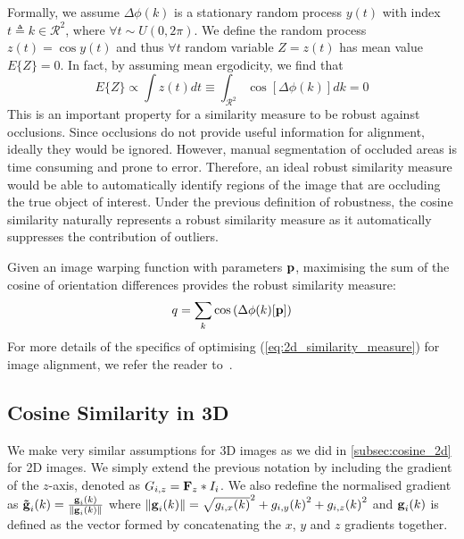 Formally, we assume $\Delta \phi(k)$ is a stationary random process $y(t)$ with
index $t \triangleq k \in \mathcal{R}^2$, where $\forall t \sim U(0, 2\pi)$. We
define the random process $z(t) = \cos{y(t)}$ and thus $\forall t$ random
variable $Z = z(t)$ has mean value $E\{Z\} = 0$. In fact, by assuming mean
ergodicity, we find that
\begin{equation}\label{eq:cosine_integral}
    E\{Z\} \propto \int z(t) dt \equiv \int_{\mathcal{R}^2} \cos[\Delta \phi(k)] dk = 0
\end{equation}
This is an important property for a similarity measure to be robust against
occlusions. Since occlusions do not provide useful information for alignment,
ideally they would be ignored. However, manual segmentation of occluded areas is
time consuming and prone to error. Therefore, an ideal robust similarity measure
would be able to automatically identify regions of the image that are occluding
the true object of interest. Under the previous definition of robustness, the
cosine similarity naturally represents a robust similarity measure as it
automatically suppresses the contribution of outliers.

Given an image warping function with parameters $\boldsymbol{\mathbf{p}}$, maximising the sum
of the cosine of orientation differences provides the robust similarity measure:
\begin{equation}\label{eq:2d_similarity_measure}
    q = \sum_k \cos \left(\Delta \phi(k)[\boldsymbol{\mathbf{p}}]\right)
\end{equation}
For more details of the specifics of optimising (\ref{eq:2d_similarity_measure})
for image alignment, we refer the reader to~\cite{RefWorks:6}.
\subsection{Cosine Similarity in 3D}\label{subsec:cosine_3d}
We make very similar assumptions for 3D images as we did in
\cref{subsec:cosine_2d} for 2D images. We simply extend the previous
notation by including the gradient of the $z$-axis, denoted as $G_{i,z} = \boldsymbol{\mathbf{F}}_z \ast I_i$. 
We also redefine the normalised gradient as
$\boldsymbol{\mathbf{\tilde{g}}}_{i}(k) = \frac{\boldsymbol{\mathbf{g}}_{i}(k)}{\lVert{} \boldsymbol{\mathbf{g}}_{i}(k) \rVert}$
where $\lVert{} \boldsymbol{\mathbf{g}}_{i}(k) \rVert = {\sqrt{g_{i,x}(k)}^2 + {g_{i,y}(k)}^2 +
{g_{i,z}(k)}^2}$ and $\boldsymbol{\mathbf{g}}_{i}(k)$ is defined as the vector formed by
concatenating the $x$, $y$ and $z$ gradients together.

